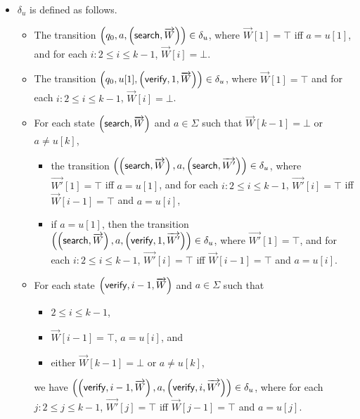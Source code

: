 \begin{definition}
\begin{itemize}
	\item $\delta_{u}$ is defined as follows.
	\begin{itemize}
		\item The transition $\left(q_0, a, \left(\mathsf{search}, \overrightarrow{W}\right)\right) \in \delta_u$, where $\overrightarrow{W}[1]=\top$ iff $a = u[1]$, and for each $i: 2 \le i \le k-1$, $\overrightarrow{W}[i] = \bot$.
		\item The transition $\left(q_0, u[1], \left(\mathsf{verify}, 1, \overrightarrow{W}\right)\right) \in \delta_u$, where $\overrightarrow{W}[1]=\top$ and for each $i: 2 \le i \le k-1$, $\overrightarrow{W}[i] = \bot$.
%
		\item For each state $\left(\mathsf{search}, \overrightarrow{W} \right)$ and $a \in \Sigma$ such that $\overrightarrow{W}[k-1] = \bot$ or $a \neq u[k]$,
		\begin{itemize}
			\item the transition $\left(\left(\mathsf{search}, \overrightarrow{W} \right), a, \left(\mathsf{search}, \overrightarrow{W'} \right)\right) \in \delta_u$, where $\overrightarrow{W'}[1] = \top$ iff $a = u[1]$, and for each $i: 2 \le i \le k-1$, $\overrightarrow{W'}[i] =\top$ iff $\overrightarrow{W}[{i-1}] = \top$ and $a = u[i]$,
			\item if $a = u[1]$, then the transition $\left(\left(\mathsf{search}, \overrightarrow{W} \right), a, \left(\mathsf{verify}, 1, \overrightarrow{W'} \right)\right) \in \delta_u$, where $\overrightarrow{W'}[1]=\top$,  and for each $i: 2 \le i \le k-1$, $\overrightarrow{W'}[i] =\top$ iff $\overrightarrow{W}[{i-1}] = \top$ and $a = u[i]$.
		\end{itemize}
		\item For each state $\left(\mathsf{verify}, i-1, \overrightarrow{W} \right)$ and $a \in \Sigma$ such that
		\begin{itemize}
			\item $2 \le i \le k-1$,
			\item $\overrightarrow{W}[i-1]=\top$, $a = u[i]$, and
			\item either $\overrightarrow{W}[k-1]=\bot$ or $a \neq u[k]$,
		\end{itemize}
		we have $\left(\left(\mathsf{verify}, i-1, \overrightarrow{W} \right), a, \left(\mathsf{verify}, i, \overrightarrow{W'} \right)\right) \in \delta_u$, where for each $j: 2 \le j \le k-1$, $\overrightarrow{W'}[j] = \top$ iff $\overrightarrow{W}[j-1]=\top$ and $a = u[j]$.

\end{itemize}
\end{itemize}
\end{definition}
